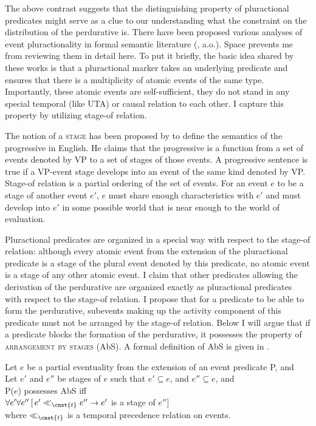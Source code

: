 \documentclass[output=paper,
]{langscibook}
\begin{document}
\noindent The above contrast suggests that the distinguishing property of pluractional predicates might serve as a clue to our understanding what the constraint on the distribution of the perdurative is. There have been proposed various analyses of event pluractionality in formal semantic literature (\citealt{lasersohn1995plurality,van2004adverbials,tovena2010pluractionality,henderson2012ways}, a.o.). Space prevents me from reviewing them in detail here. To put it briefly, the basic idea shared by these works is that a pluractional marker takes an underlying predicate and ensures that there is a multiplicity of atomic events of the same type. Importantly, these atomic events are self-sufficient, they do not stand in any special temporal (like UTA) or causal relation to each other. I capture this property by utilizing  stage-of relation. 

The notion of a \textsc{stage} has been proposed by \citet{landman1992progressive} to define the semantics of the progressive in English. He claims that the progressive is a function from a set of events denoted by VP to a set of stages of those events. A progressive sentence is true if a VP-event stage develops into an event of the same kind denoted by VP. Stage-of relation is a partial ordering of the set of events. For an event $e$ to be a stage of another event $e′$, $e$ must share enough characteristics with $e′$ and must develop into $e′$ in some possible world that is near enough to the world of evaluation. 

Pluractional predicates are organized in a special way with respect to the stage-of relation: although every atomic event from the extension of the pluractional predicate is a stage of the plural event denoted by this predicate, no atomic event is a stage of any other atomic event. I claim that other predicates allowing the derivation of the perdurative are organized exactly as pluractional predicates with respect to the stage-of relation. I propose that for a predicate to be able to form the perdurative, subevents making up the activity component of this predicate must not be arranged by the stage-of relation. Below I will argue that if a predicate blocks the formation of the perdurative, it possesses the property of \textsc{arrangement by stages} (AbS). A formal definition of AbS is given in .

\ea \label{ex:naumov:34}
Let $e$ be a partial eventuality from the extension of an event predicate P, and \\
Let $e'$ and $e''$ be stages of $e$ such that
\ea $e' \subseteq e$, and
\ex $e'' \subseteq e$, and\smallskip\\
P($e$) possesses AbS iff \\
$\forall e' \forall e''\,[\,e' \ll_{\cnst{t}} e'' \rightarrow e'$ is a stage of $e'']$\smallskip\\
where $\ll_{\cnst{t}}$ is a temporal precedence relation on events.
\z \z
\end{document}
